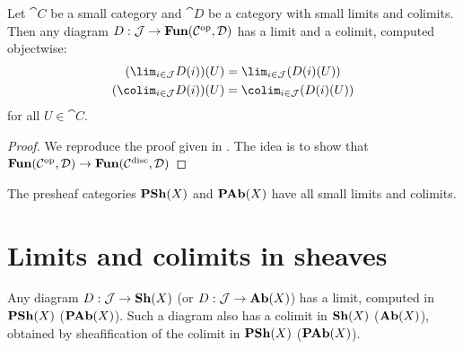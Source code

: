 \documentclass[../main.tex]{subfiles}
\begin{document}
\begin{lem}
	Let $\cat C$ be a small category and $\cat D$ be a category with small limits and colimits.
	Then any diagram $D: \mathcal{J} \to \operatorname{\mathbf{Fun}}(\mathcal{C}^{\mathrm{op}}, \mathcal{D})$ has a limit and a colimit, computed objectwise:
	\begin{align*}
    	(\lim_{i\in \cat J}D(i))(U) &= \lim_{i \in \cat J}(D(i)(U))\\
    	(\colim_{i\in \cat J}D(i))(U) &= \colim_{i \in \cat J}(D(i)(U))
    \end{align*} for all $U \in \cat C$. 

\end{lem}
\begin{proof}
	We reproduce the proof given in \cite{riehlCategoryTheoryContext2016}. The idea is to show that $\operatorname{\mathbf{Fun}}(\mathcal{C}^{\mathrm{op}}, \mathcal{D}) \to \operatorname{\mathbf{Fun}}(\mathcal{C}^\text{disc}, \mathcal{D})$ 	
\end{proof}

\begin{cor}
	The presheaf categories $\operatorname{\mathbf{PSh}}(X)$ and $\operatorname{\mathbf{PAb}}(X)$ have all small limits and colimits.
\end{cor}

\section{Limits and colimits in sheaves}

\begin{thm}
	Any diagram $D: \mathcal{J} \to \operatorname{\mathbf{Sh}}(X)$ (or $D: \mathcal{J} \to \operatorname{\mathbf{Ab}}(X)$) has a limit, computed in $\operatorname{\mathbf{PSh}}(X)$ ($\operatorname{\mathbf{PAb}}(X)$).
	Such a diagram also has a colimit in $\operatorname{\mathbf{Sh}}(X)$ ($\operatorname{\mathbf{Ab}}(X)$), obtained by sheafification of the colimit in $\operatorname{\mathbf{PSh}}(X)$ ($\operatorname{\mathbf{PAb}}(X)$).
\end{thm}
\end{document}
